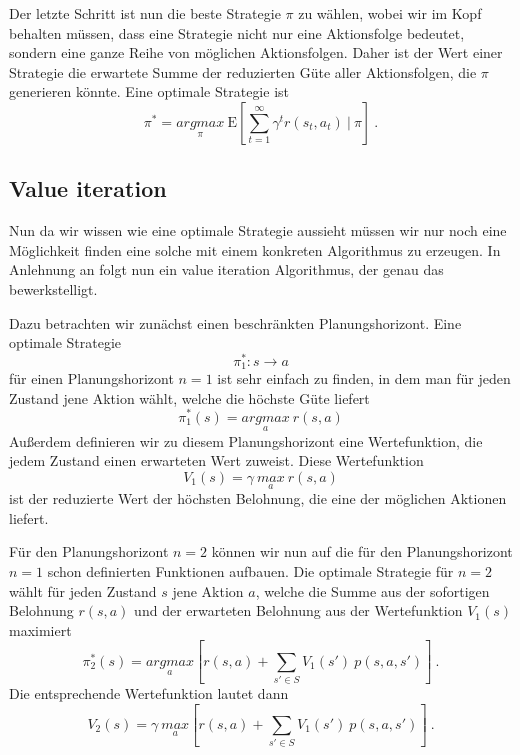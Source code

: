 \documentclass[a4paper]{IEEEtran}
\def\E{\mathrm{E}} %
\begin{document}
Der letzte Schritt ist nun die beste Strategie $\pi$ zu wählen, wobei wir im Kopf behalten müssen, dass eine Strategie nicht nur eine Aktionsfolge bedeutet, sondern eine ganze Reihe von möglichen Aktionsfolgen. Daher ist der Wert einer Strategie die erwartete Summe der reduzierten Güte aller Aktionsfolgen, die $\pi$ generieren könnte. Eine optimale Strategie ist
\begin{equation}
	\pi^* = \underset{\pi}{argmax}\ \E \left[ \sum\limits_{t=1}^{\infty} \gamma^t r(s_t, a_t) \ \vert\ \pi \right]\ .
\end{equation}

\subsection{Value iteration} %
Nun da wir wissen wie eine optimale Strategie aussieht müssen wir nur noch eine Möglichkeit finden eine solche mit einem konkreten Algorithmus zu erzeugen. In Anlehnung an \cite{thrun2005probabilistic} folgt nun ein value iteration Algorithmus, der genau das bewerkstelligt. %

Dazu betrachten wir zunächst einen beschränkten Planungshorizont. Eine optimale Strategie 
\begin{equation}
	\pi_1^*: s \rightarrow a
\end{equation}
für einen Planungshorizont $n=1$ ist sehr einfach zu finden, in dem man für jeden Zustand jene Aktion wählt, welche die höchste Güte liefert
\begin{equation}
	\pi_1^*(s)= \underset{a}{argmax}\ r(s, a)
\end{equation}
Außerdem definieren wir zu diesem Planungshorizont eine Wertefunktion, die jedem Zustand einen erwarteten Wert zuweist. Diese Wertefunktion
\begin{equation}
	V_1(s) = \gamma\ \underset{a}{max}\ r(s, a)
\end{equation}
ist der reduzierte Wert der höchsten Belohnung, die eine der möglichen Aktionen liefert.

Für den Planungshorizont $n=2$ können wir nun auf die für den Planungshorizont $n=1$ schon definierten Funktionen aufbauen. Die optimale Strategie für $n=2$ wählt für jeden Zustand $s$ jene Aktion $a$, welche die Summe aus der sofortigen Belohnung $r(s,a)$ und der erwarteten Belohnung aus der Wertefunktion $V_1(s)$ maximiert
\begin{equation}
	\pi_2^*(s) = \underset{a}{argmax} \left[ r(s,a) + \sum_{s' \in S} V_1(s')\ p(s, a, s') \right]\ .
\end{equation}
Die entsprechende Wertefunktion lautet dann
\begin{equation}
	V_2(s) = \gamma\ \underset{a}{max} \left[ r(s,a) + \sum_{s' \in S} V_1(s')\ p(s, a, s') \right]\ .
\end{equation}
\end{document}

